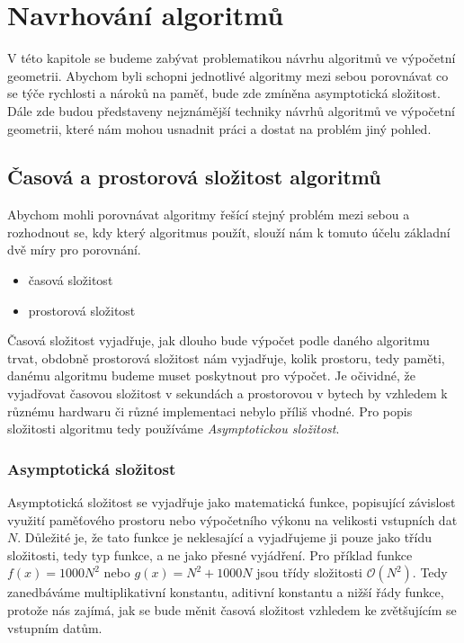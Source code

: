 \chapter{Navrhování algoritmů}
\label{chap:navrhovanialgoritmu}
	V této kapitole se budeme zabývat problematikou návrhu algoritmů ve výpočetní geometrii. Abychom byli schopni jednotlivé algoritmy mezi sebou porovnávat co se týče rychlosti a nároků na paměť, bude zde zmíněna asymptotická složitost. Dále zde budou představeny nejznámější techniky návrhů algoritmů ve výpočetní geometrii, které nám mohou usnadnit práci a dostat na problém jiný pohled.

\section{Časová a prostorová složitost algoritmů}
	Abychom mohli porovnávat algoritmy řešící stejný problém mezi sebou a rozhodnout se, kdy který algoritmus použít, slouží nám k tomuto účelu základní dvě míry pro porovnání.
\begin{itemize}
	\item časová složitost
	\item prostorová složitost
\end{itemize}
	Časová složitost vyjadřuje, jak dlouho bude výpočet podle daného algoritmu trvat, obdobně prostorová složitost nám vyjadřuje, kolik prostoru, tedy paměti, danému algoritmu budeme muset poskytnout pro výpočet. Je očividné, že vyjadřovat časovou složitost v sekundách a prostorovou v bytech by vzhledem k různému hardwaru či různé implementaci nebylo příliš vhodné. Pro popis složitosti algoritmu tedy používáme \textit{Asymptotickou složitost}.
	
\subsection{Asymptotická složitost}
	Asymptotická složitost se vyjadřuje jako matematická funkce, popisující závislost využití paměťového prostoru nebo výpočetního výkonu na velikosti vstupních dat $N$. Důležité je, že tato funkce je neklesající a vyjadřujeme ji pouze jako třídu složitosti, tedy typ funkce, a ne jako přesné vyjádření. Pro příklad funkce $f(x)=1000N^2$ nebo $g(x)=N^2 + 1000N$ jsou třídy složitosti $\mathcal{O} (N^2)$. Tedy zanedbáváme multiplikativní konstantu, aditivní konstantu a nižší řády funkce, protože nás zajímá, jak se bude měnit časová složitost vzhledem ke zvětšujícím se vstupním datům.
	
